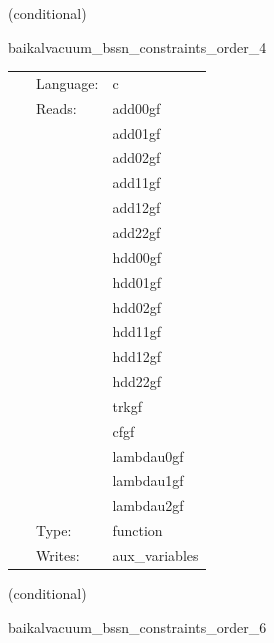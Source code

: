 \vspace{5mm}

   (conditional) 

\hspace{5mm} baikalvacuum\_bssn\_constraints\_order\_4 

\hspace{5mm}{\it compute bssn hamiltonian, momentum, and conformal connection constraints, at finite-differencing order 4 } 


\hspace{5mm}

 \begin{tabular*}{160mm}{cll} 
~ & Language:  & c \\ 
~ & Reads:  & add00gf \\ 
~& ~ &add01gf\\ 
~& ~ &add02gf\\ 
~& ~ &add11gf\\ 
~& ~ &add12gf\\ 
~& ~ &add22gf\\ 
~& ~ &hdd00gf\\ 
~& ~ &hdd01gf\\ 
~& ~ &hdd02gf\\ 
~& ~ &hdd11gf\\ 
~& ~ &hdd12gf\\ 
~& ~ &hdd22gf\\ 
~& ~ &trkgf\\ 
~& ~ &cfgf\\ 
~& ~ &lambdau0gf\\ 
~& ~ &lambdau1gf\\ 
~& ~ &lambdau2gf\\ 
~ & Type:  & function \\ 
~ & Writes:  & aux\_variables \\ 
\end{tabular*} 


\vspace{5mm}

   (conditional) 

\hspace{5mm} baikalvacuum\_bssn\_constraints\_order\_6 

\hspace{5mm}{\it compute bssn hamiltonian, momentum, and conformal connection constraints, at finite-differencing order 6 } 


\hspace{5mm}

